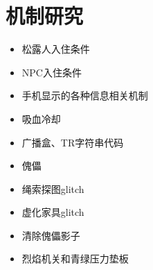 \section{机制研究}
\begin{itemize}
\item {} 松露人入住条件 
\item {} NPC入住条件 
\item {} 手机显示的各种信息相关机制 
\item {} 吸血冷却 
\item {} 广播盒、TR字符串代码 
\item {} 傀儡  
\item {} 绳索探图glitch 
\item {} 虚化家具glitch 
\item {} 清除傀儡影子 
\item {} 烈焰机关和青绿压力垫板 
\end{itemize}

